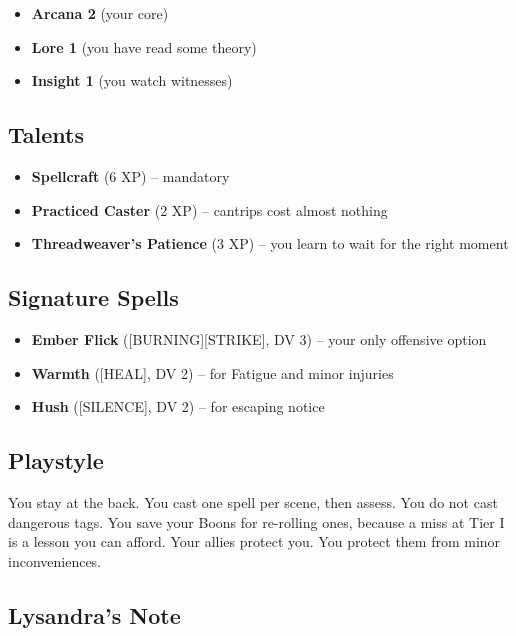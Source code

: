 \begin{itemize}
    \item \textbf{Arcana 2} (your core)
    \item \textbf{Lore 1} (you have read some theory)
    \item \textbf{Insight 1} (you watch witnesses)
\end{itemize}

\subsection{Talents}

\begin{itemize}
    \item \textbf{Spellcraft} (6 XP) -- mandatory
    \item \textbf{Practiced Caster} (2 XP) -- cantrips cost almost nothing
    \item \textbf{Threadweaver's Patience} (3 XP) -- you learn to wait for the right moment
\end{itemize}

\subsection{Signature Spells}

\begin{itemize}
    \item \textbf{Ember Flick} ([BURNING][STRIKE], DV 3) -- your only offensive option
    \item \textbf{Warmth} ([HEAL], DV 2) -- for Fatigue and minor injuries
    \item \textbf{Hush} ([SILENCE], DV 2) -- for escaping notice
\end{itemize}

\subsection{Playstyle}

You stay at the back. You cast one spell per scene, then assess. You do not cast dangerous tags. You save your Boons for re-rolling ones, because a miss at Tier I is a lesson you can afford. Your allies protect you. You protect them from minor inconveniences.

\subsection{Lysandra's Note}

